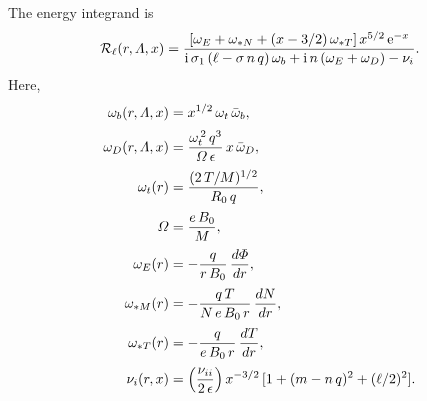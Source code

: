 \documentclass[12pt,prb,aps,notitlepage]{revtex4-1}
\begin{document}
The energy integrand is 
\begin{equation}
{\cal R}_\ell(r,{\mit\Lambda},x) =\frac{[\omega_E + \omega_{\ast N}+(x-3/2)\,\omega_{\ast T}]\,x^{5/2}\,{\rm e}^{-x}}{
{\rm i}\,\sigma_1\,(\ell - \sigma\,n\,q)\,\omega_b +{\rm i}\,n\,(\omega_E+\omega_D)-\nu_i}.
\end{equation}
Here, 
\begin{align}
\omega_b(r,{\mit\Lambda},x) &= x^{1/2}\,\omega_t\,\bar{\omega}_b,\\[0.5ex]
\omega_D(r,{\mit\Lambda,x}) &= \frac{\omega_t^{\,2}\,q^3}{{\mit\Omega}\,\epsilon}\,x\,\bar{\omega}_D,\\[0.5ex]
\omega_t(r) &= \frac{(2\,T/M)^{1/2}}{R_0\,q},\\[0.5ex]
{\mit\Omega} &= \frac{e\,B_0}{M},\\[0.5ex]
\omega_E(r) &= - \frac{q}{r\,B_0}\,\frac{d{\mit\Phi}}{dr},\\[0.5ex]
\omega_{\ast M}(r) &= -\frac{q\,T}{N\,e\,B_0\,r}\,\frac{dN}{dr},\\[0.5ex]
\omega_{\ast T}(r) &= - \frac{q}{e\,B_0\,r}\,\frac{dT}{dr},\\[0.5ex]
\nu_i(r,x) &= \left(\frac{\nu_{ii}}{2\,\epsilon}\right) x^{-3/2}\,[1+(m-n\,q)^2 + (\ell/2)^2].
\end{align}
\end{document}
